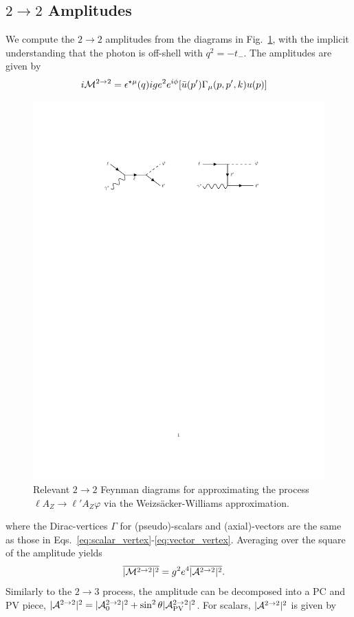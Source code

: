 \subsection{$2 \rightarrow 2$ Amplitudes}
We compute the $2\rightarrow 2$ amplitudes from the diagrams in Fig.~\ref{fig:WW_diagrams}, with the implicit understanding that the photon is off-shell with $q^2 = -t_-$. The amplitudes are given by 
\begin{align}
    i{\cal M}^{2\rightarrow 2} &= \epsilon^{\star\mu}(q)ige^2e^{i\phi}[\bar{u}(p')\Gamma_\mu(p, p', k)u(p)]
\end{align}
\begin{figure}[t!]
    \vspace{5mm}
    \centering
    \includegraphics[width=\linewidth]{figures/chapter4/WW_diagrams.pdf}
    \caption{Relevant $2\rightarrow 2$ Feynman diagrams for approximating the process $\ell A_Z \rightarrow \ell' A_Z \varphi$ via the Weizs\"acker-Williams approximation.}
    \label{fig:WW_diagrams}
\end{figure}
where the Dirac-vertices $\Gamma$ for (pseudo)-scalars and (axial)-vectors are the same as those in Eqs.~\ref{eq:scalar_vertex}-\ref{eq:vector_vertex}. Averaging over the square of the amplitude yields
\begin{align}
    \overline{|{\cal M}^{2\rightarrow 2}|^2} &= g^2 e^4 \overline{|{\cal A}^{2\rightarrow 2}|^2}.
\end{align}
Similarly to the $2\rightarrow 3$ process, the amplitude can be decomposed into a PC and PV piece, $|{\cal A}^{2\rightarrow 2}|^2 = |{\cal A}_0^{2\rightarrow 2}|^2 + \sin^2{\theta}|{\cal A}_{\rm PV}^{2\rightarrow 2}|^2$. For scalars, $|{\cal A}^{2\rightarrow2}|^2$ is given by

